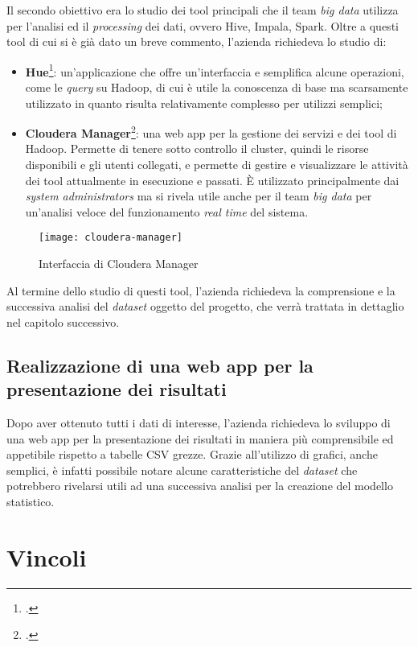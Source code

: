 Il secondo obiettivo era lo studio dei tool principali che il team \textit{big data} utilizza per l'analisi ed il \textit{processing} dei dati, ovvero Hive, Impala, Spark. Oltre a questi tool di cui si è già dato un breve commento, l'azienda richiedeva lo studio di:
\begin{itemize}
	\item \textbf{Hue}\footcite{http://gethue.com/}: un'applicazione che offre un'interfaccia e semplifica alcune operazioni, come le \textit{query} su Hadoop, di cui è utile la conoscenza di base ma scarsamente utilizzato in quanto risulta relativamente complesso per utilizzi semplici;
	\item \textbf{Cloudera Manager}\footcite{https://www.cloudera.com/products/product-components/cloudera-manager.html}: una web app per la gestione dei servizi e dei tool di Hadoop. Permette di tenere sotto controllo il cluster, quindi le risorse disponibili e gli utenti collegati, e permette di gestire e visualizzare le attività dei tool attualmente in esecuzione e passati. È utilizzato principalmente dai \textit{system administrators} ma si rivela utile anche per il team \textit{big data} per un'analisi veloce del funzionamento \textit{real time} del sistema.
\end{itemize} 
\begin{figure}[!h] 
	\centering 
	\texttt{[image: cloudera-manager]}
	\caption{Interfaccia di Cloudera Manager}
\end{figure}
Al termine dello studio di questi tool, l'azienda richiedeva la comprensione e la successiva analisi del \textit{dataset} oggetto del progetto, che verrà trattata in dettaglio nel capitolo successivo.
\subsection{Realizzazione di una web app per la presentazione dei risultati}
Dopo aver ottenuto tutti i dati di interesse, l'azienda richiedeva lo sviluppo di una \gls{web app} per la presentazione dei risultati in maniera più comprensibile ed appetibile rispetto a tabelle CSV grezze. Grazie all'utilizzo di grafici, anche semplici, è infatti possibile notare alcune caratteristiche del \textit{dataset} che potrebbero rivelarsi utili ad una successiva analisi per la creazione del modello statistico.
\section{Vincoli}
